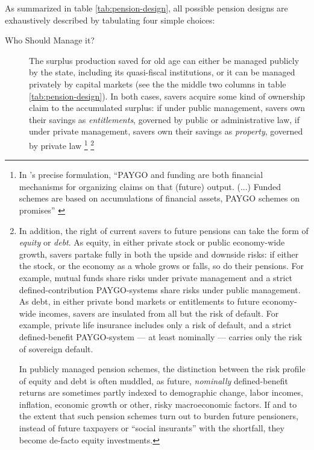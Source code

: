 \documentclass[11pt,a4paper,oneside,openright]{article}
\begin{document}
As summarized in table \ref{tab:pension-design}, all possible pension designs are exhaustively described by tabulating four simple choices:

\begin{description}
	\item[Who Should Manage it?] The surplus production saved for old age can either be managed publicly by the state, including its quasi-fiscal institutions, or it can be managed privately by capital markets (see the the middle two columns in table \ref{tab:pension-design}). 
	In both cases, savers acquire some kind of ownership claim to the accumulated surplus: 
	if under public management, savers own their savings as \emph{entitlements}, governed by public or administrative law, if under private management, savers own their savings as \emph{property}, governed by private law
	\footnote{
		In \citeauthor{Barr2005a}'s precise formulation, ``PAYGO and funding are both financial mechanisms for organizing claims on that (future) output. 
		(...) 
		Funded schemes are based on accumulations of financial assets, PAYGO schemes on promises'' \citeyearpar[157]{Barr2005a}
	} 
	\footnote{
		In addition, the right of current savers to future pensions can take the form of \emph{equity} or \emph{debt}. 
		As equity, in either private stock or public economy-wide growth, savers partake fully in both the upside and downside risks: 
		if either the stock, or the economy as a whole grows or falls, so do their pensions. 
		For example, mutual funds share risks under private management and a strict defined-contribution PAYGO-systems share risks under public management. 
		As debt, in either private bond markets or entitlements to future economy-wide incomes, savers are insulated from all but the risk of default. 
		For example, private life insurance includes only a risk of default, and a strict defined-benefit PAYGO-system --- at least nominally --- carries only the risk of sovereign default.
		
		In publicly managed pension schemes, the distinction between the risk profile of equity and debt is often muddled, as future, \emph{nominally} defined-benefit returns are sometimes partly indexed to demographic change, labor incomes, inflation, economic growth or other, risky macroeconomic factors. 
		If and to the extent that such pension schemes turn out to burden future pensioners, instead of future taxpayers or ``social insurants'' with the shortfall, they become de-facto equity investments.
		
}
\end{description}
\end{document}
